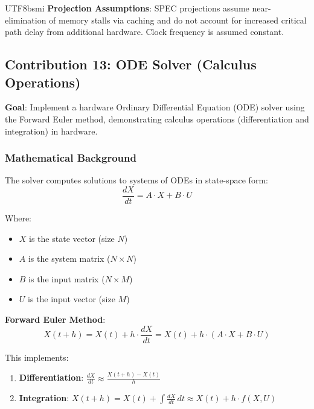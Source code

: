 \documentclass[journal,twoside]{IEEEtran}
\begin{document}
\begin{CJK}{UTF8}{bsmi}
\textbf{Projection Assumptions}: SPEC projections assume near-elimination of memory stalls via caching and do not account for increased critical path delay from additional hardware. Clock frequency is assumed constant.

\subsection{Contribution 13: ODE Solver (Calculus Operations)}

\textbf{Goal}: Implement a hardware Ordinary Differential Equation (ODE) solver using the Forward Euler method, demonstrating calculus operations (differentiation and integration) in hardware.

\subsubsection{Mathematical Background}
The solver computes solutions to systems of ODEs in state-space form:
\begin{equation}
\frac{dX}{dt} = A \cdot X + B \cdot U
\label{eq:ode}
\end{equation}

Where:
\begin{itemize}
    \item $X$ is the state vector (size $N$)
    \item $A$ is the system matrix ($N \times N$)
    \item $B$ is the input matrix ($N \times M$)
    \item $U$ is the input vector (size $M$)
\end{itemize}

\textbf{Forward Euler Method}:
\begin{equation}
X(t+h) = X(t) + h \cdot \frac{dX}{dt} = X(t) + h \cdot (A \cdot X + B \cdot U)
\label{eq:euler}
\end{equation}

This implements:
\begin{enumerate}
    \item \textbf{Differentiation}: $\frac{dX}{dt} \approx \frac{X(t+h) - X(t)}{h}$
    \item \textbf{Integration}: $X(t+h) = X(t) + \int \frac{dX}{dt} \, dt \approx X(t) + h \cdot f(X, U)$
\end{enumerate}


\end{CJK}
\end{document}
